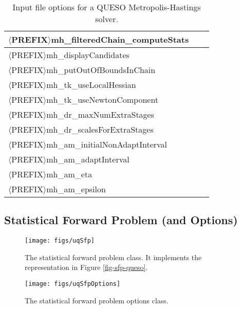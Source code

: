 \begin{table}[!h]
\begin{center}
\begin{tabular}{|l|c|c|}
\hline
$\langle$PREFIX$\rangle$mh\_filteredChain\_computeStats         &         &             \\
\hline
$\langle$PREFIX$\rangle$mh\_displayCandidates                   &         &             \\
\hline
$\langle$PREFIX$\rangle$mh\_putOutOfBoundsInChain               &         &             \\
\hline
$\langle$PREFIX$\rangle$mh\_tk\_useLocalHessian                 &         &             \\
\hline
$\langle$PREFIX$\rangle$mh\_tk\_useNewtonComponent              &         &             \\
\hline
$\langle$PREFIX$\rangle$mh\_dr\_maxNumExtraStages               &         &             \\
\hline
$\langle$PREFIX$\rangle$mh\_dr\_scalesForExtraStages            &         &             \\
\hline
$\langle$PREFIX$\rangle$mh\_am\_initialNonAdaptInterval         &         &             \\
\hline
$\langle$PREFIX$\rangle$mh\_am\_adaptInterval                   &         &             \\
\hline
$\langle$PREFIX$\rangle$mh\_am\_eta                             &         &             \\
\hline
$\langle$PREFIX$\rangle$mh\_am\_epsilon                         &         &             \\
\hline
\end{tabular}
\end{center}
\caption{
Input file options for a QUESO Metropolis-Hastings solver.
}
\label{tab-metropolis-hastings-options}
\end{table}

\clearpage
\subsection{Statistical Forward Problem (and Options)}

\begin{figure}[h!]
\centerline{
\texttt{[image: figs/uqSfp]}
}
\caption{
The statistical forward problem class. It implements the representation in Figure \ref{fig-sfp-queso}.
}
\label{fig-sfp-class}
\end{figure}

\begin{figure}[h!]
\begin{center}
\texttt{[image: figs/uqSfpOptions]}
\end{center}
\caption{
The statistical forward problem options class.
}
\label{fig-sfp-options-class}
\end{figure}

